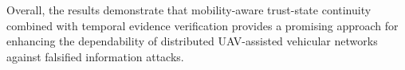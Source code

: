 \documentclass[journal]{IEEEtran}
\begin{document}
Overall, the results demonstrate that mobility-aware trust-state continuity
combined with temporal evidence verification provides a promising approach
for enhancing the dependability of distributed UAV-assisted vehicular
networks against falsified information attacks.






%


\ifCLASSOPTIONcaptionsoff
  \newpage
\fi





%
%
%








\end{document}
